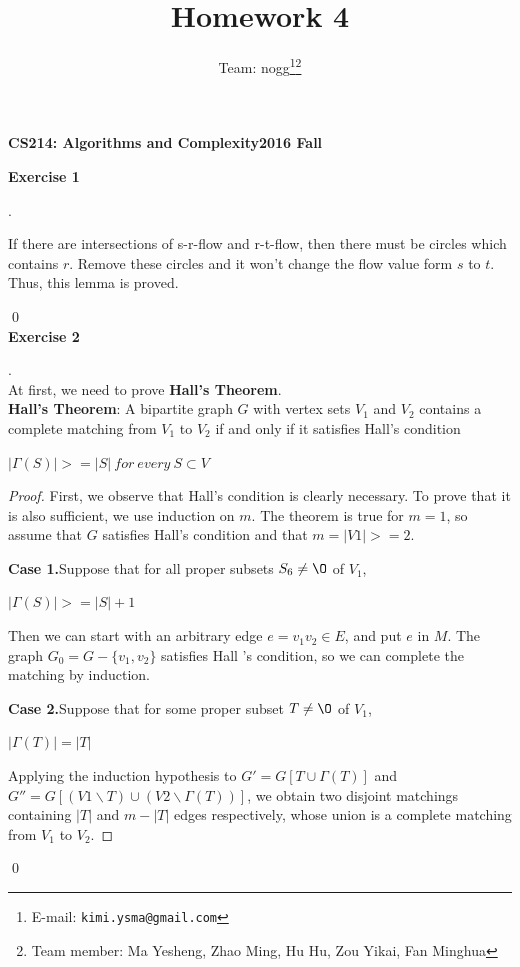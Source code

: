 \documentclass[12pt, notitlepage]{article}
\title{Homework 4}
\author{Team: nogg\footnote{E-mail: \texttt{kimi.ysma@gmail.com}}\footnote{Team member: Ma Yesheng, Zhao Ming, Hu Hu, Zou Yikai, Fan Minghua}}
\newenvironment{sol}
  {\par\vspace{3mm}\noindent{\it Solution}.}{\qed}
\begin{document}
{\bf\small CS214: Algorithms and Complexity}\hfill{\bf\small 2016 Fall}
{\let\newpage\relax\maketitle}

\textbf{Exercise 1}
\begin{sol}
	
\qquad If there are intersections of s-r-flow and r-t-flow, then there must be circles which contains $r$. Remove these circles and it won't change the flow value form $s$ to $t$. Thus, this lemma is proved.

\end{sol}\\

\textbf{Exercise 2}
\begin{sol}\\
At first, we need to prove \textbf{Hall's Theorem}.\\
\textbf{Hall's Theorem}: A bipartite graph $G$ with vertex sets $V_1$ and $V_2$ contains a complete matching
from $V_1$ to $V_2$ if and only if it satisfies Hall's condition\\
\centerline{$|\Gamma (S)| >= |S|\ for\ every\ S \subset V$}
\begin{proof}
First, we observe that Hall’s condition is clearly necessary. To prove that it is also sufficient, we use induction on $m$. The theorem is true for $m = 1$, so assume that $G$ satisfies Hall’s condition and that $m = |V1| >= 2$.

\qquad \textbf{Case 1.}Suppose that for all proper subsets $S _6 \neq \O$ of $V_1$,\\
\centerline{$|\Gamma(S)| >= |S| + 1$}
Then we can start with an arbitrary edge $e = v_1v_2 \in E$, and put $e$ in $M$. The graph $G_0 = G- \{v_1, v_2\}$ satisfies Hall ’s condition, so we can complete the matching by induction.

\qquad \textbf{Case 2.}Suppose that for some proper subset $T \neq \O$ of $V_1$,\\
\centerline{$|\Gamma (T)| = |T|$}
Applying the induction hypothesis to $G' = G[T \cup \Gamma (T)]$ and $G'' = G[(V1 \backslash T) \cup (V2 \backslash \Gamma (T))]$, we obtain two disjoint matchings containing $|T|$ and $m-|T|$ edges respectively, whose union is a complete matching from $V_1$ to $V_2$.
\end{proof}


\end{sol}
\end{document}
